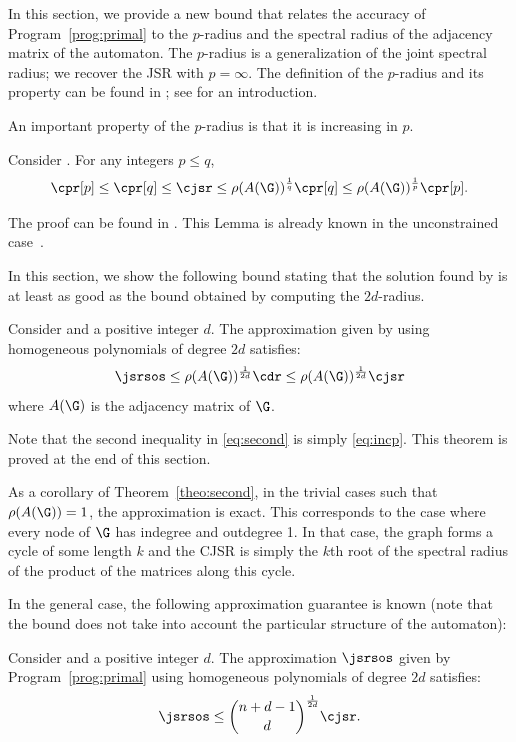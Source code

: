 In this section, we provide a new bound that relates the accuracy of Program~\ref{prog:primal} to the $p$-radius and the spectral radius of the adjacency matrix of the automaton.
The $p$-radius is a generalization of the joint spectral radius;
we recover the JSR with $p=\infty$.
The definition of the $p$-radius and its property can be found in ; see \cite{jungers2011fast} for an introduction.

An important property of the $p$-radius is that it is increasing in $p$.
\begin{lemma}
  \label{lem:incp}
  Consider .
  For any integers $p \leq q$,
  \begin{equation}
    \label{eq:incp}
    \cpr[p] \leq \cpr[q] \leq \cjsr \leq \rho(A(\G))^{\frac{1}{q}}
    \cpr[q] \leq \rho(A(\G))^{\frac{1}{p}} \cpr[p].
  \end{equation}
\end{lemma}
The proof can be found in .
This Lemma is already known in the unconstrained case~\cite{zhou2002p}.



In this section, we show the following bound stating that the solution found by  is at least as good as the bound obtained by computing the $2d$-radius.
\begin{theorem}
  \label{theo:second}
  Consider  and a positive integer $d$.
  The approximation given by  using homogeneous polynomials of degree $2d$
  satisfies:
  \begin{equation}
    \label{eq:second}
    \jsrsos \leq \rho(A(\G))^{\frac{1}{2d}}\cdr \leq \rho(A(\G))^{\frac{1}{2d}} \cjsr
  \end{equation}
  where $A(\G)$ is the adjacency matrix of $\G$.
\end{theorem}
Note that the second inequality in \eqref{eq:second} is simply \eqref{eq:incp}.
This theorem is proved at the end of this section.

As a corollary of Theorem~\ref{theo:second}, in the trivial cases such that $\rho(A(\G)) = 1$, the approximation is exact.
This corresponds to the case where every node of $\G$ has indegree and outdegree 1.
In that case, the graph forms a cycle of some length $k$ and the CJSR is simply the $k$th root of the spectral radius of the product of the matrices along this cycle.

In the general case, the following approximation guarantee is known (note that the bound does not take into account the particular structure of the automaton):
\begin{theorem}
  \label{theo:matt}
  Consider  and a positive integer $d$.
  The approximation $\jsrsos$ given by Program~\ref{prog:primal} using homogeneous polynomials of degree $2d$
  satisfies:
  \[ \jsrsos \leq {n+d-1 \choose d}^{\frac{1}{2d}} \cjsr. \]
\end{theorem}

